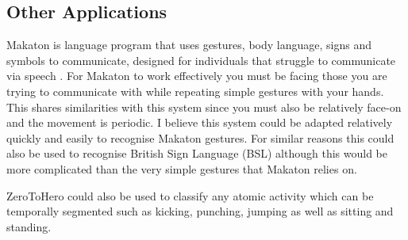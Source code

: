 \subsection{Other Applications}
Makaton is language program that uses gestures, body language, signs and symbols to communicate, designed for individuals that struggle to communicate via speech \cite{MAKATON} \cite{MAKATONwiki}. For Makaton to work effectively you must be facing those you are trying to communicate with while repeating simple gestures with your hands. This shares similarities with this system since you must also be relatively face-on and the movement is periodic. I believe this system could be adapted relatively quickly and easily to recognise Makaton gestures. For similar reasons this could also be used to recognise British Sign Language (BSL) although this would be more complicated than the very simple gestures that Makaton relies on.

\begin{figure}[h]
\centering
\begin{minipage}{7.0cm}
    \centering
    \label{fig:1}
\end{minipage}
\vspace{2.0cm}
\begin{minipage}{7.0cm}
    \centering
    \label{fig:2}
\end{minipage}
\end{figure}

ZeroToHero could also be used to classify any atomic activity \cite{Aggarwal2007} which can be temporally segmented such as kicking, punching, jumping as well as sitting and standing. 

